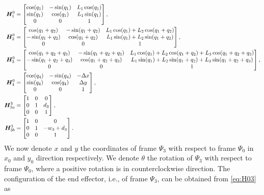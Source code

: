 \documentclass[../DC2019003Bouma.tex]{subfiles}
\begin{document}
\begin{align}
{\boldsymbol{H}}^0_1 &= \begin{bmatrix}
\cos(q_1) & -\sin(q_1) & L_1\cos(q_1) \\
\sin(q_1) & \cos(q_1) & L_1\sin(q_1)\\
0 & 0 & 1
\end{bmatrix},\label{eq:H01}\\
{\boldsymbol{H}}^0_2 &= \begin{bmatrix}
\cos(q_1+q_2) & -\sin(q_1+q_2) & L_1\cos(q_1) + L_2\cos(q_1+q_2) \\
-\sin(q_1+q_2) & \cos(q_1+q_2) & L_1\sin(q_1) + L_2\sin(q_1+q_2)\\
0 & 0 & 1 
\end{bmatrix},\label{eq:H02}\\
{\boldsymbol{H}}^0_3 &= \begin{bmatrix}
\cos(q_1+q_2+q_3) & -\sin(q_1+q_2+q_3) & L_1\cos(q_1) + L_2\cos(q_1+q_2) + L_3\cos(q_1+q_2+q_3) \\
-\sin(q_1+q_2+q_3) & \cos(q_1+q_2+q_3) & L_1\sin(q_1) + L_2\sin(q_1+q_2) + L_3\sin(q_1+q_2+q_3)\\
0 & 0 & 1 
\end{bmatrix},\label{eq:H03}\\
{\boldsymbol{H}}^0_4 &= \begin{bmatrix}
\cos(q_4) & -\sin(q_4) & -\Delta x \\
\sin(q_4) & \cos(q_4) & \Delta y\\
0 & 0 & 1
\end{bmatrix},\label{eq:H04}\\
{\boldsymbol{H}}^3_{3a} &= \begin{bmatrix}
1 & 0 & 0 \\
0 & 1 & d_3\\
0 & 0 & 1
\end{bmatrix},\label{eq:H33a}\\
{\boldsymbol{H}}^3_{3b} &= \begin{bmatrix}
1 & 0 & 0 \\
0 & 1 & -w_3 + d_3\\
0 & 0 & 1
\end{bmatrix}.\label{eq:H33b}
\end{align}
We now denote $x$ and $y$ the coordinates of frame $\Psi_3$ with respect to frame $\Psi_0$ in $x_0$ and $y_0$ direction respectively. We denote $\theta$ the rotation of $\Psi_3$ with respect to frame $\Psi_0$, where a positive rotation is in counterclockwise direction. The configuration of the end effector, i.e., of frame $\Psi_3$, can be obtained from \eqref{eq:H03} as
\end{document}
